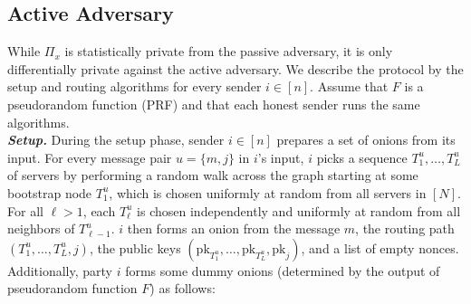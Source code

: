         
    
    

\subsection{Active Adversary}

While $\Pi_x$ is statistically private from the passive adversary, it is only differentially private against the active adversary. We describe the protocol by the setup and routing algorithms for every sender $i \in [n]$. Assume that $F$ is a pseudorandom function (PRF) and that each honest sender runs the same algorithms.\\

\textbf{\textit{Setup.}} During the setup phase, sender $i \in [n]$ prepares a set of onions from its input. For every message pair $u = \{m, j\}$ in $i$'s input, $i$ picks a sequence $T^u_1, \dots, T^u_L$ of servers by performing a random walk across the graph starting at some bootstrap node $T^u_1$, which is chosen uniformly at random from all servers in $[N]$. For all $\ell > 1$, each $T^u_\ell$ is chosen independently and uniformly at random from all neighbors of $T^u_{\ell - 1}$. $i$ then forms an onion from the message $m$, the routing path $(T^u_1, \dots, T^u_L, j)$, the public keys $(\text{pk}_{T^u_1}, \dots, \text{pk}_{T^u_L}, \text{pk}_j)$, and a list of empty nonces. Additionally, party $i$ forms some dummy onions (determined by the output of pseudorandom function $F$) as follows:\\

